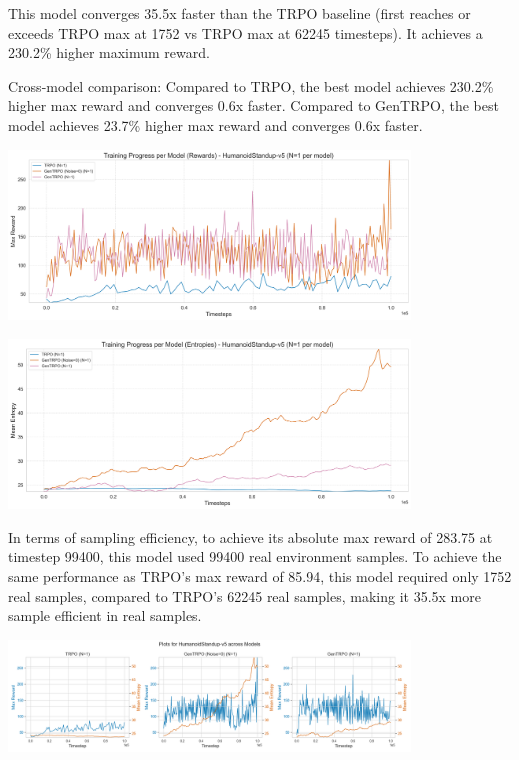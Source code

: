 \documentclass{svproc}
\begin{document}
This model converges 35.5x faster than the TRPO baseline (first reaches or exceeds TRPO max at 1752 vs TRPO max at 62245 timesteps). It achieves a 230.2\% higher maximum reward.

Cross-model comparison: Compared to TRPO, the best model achieves 230.2\% higher max reward and converges 0.6x faster. Compared to GenTRPO, the best model achieves 23.7\% higher max reward and converges 0.6x faster. 

\begin{center}
\includegraphics[width=0.8\textwidth]{graph_HumanoidStandup-v5_models_rewards.png}
\end{center}

\begin{center}
\includegraphics[width=0.8\textwidth]{graph_HumanoidStandup-v5_models_entropies.png}
\end{center}

In terms of sampling efficiency, to achieve its absolute max reward of 283.75 at timestep 99400, this model used 99400 real environment samples. To achieve the same performance as TRPO's max reward of 85.94, this model required only 1752 real samples, compared to TRPO's 62245 real samples, making it 35.5x more sample efficient in real samples.

\begin{center}
\includegraphics[width=0.8\textwidth]{grid_env_HumanoidStandup-v5.png}
\end{center}
\end{document}
